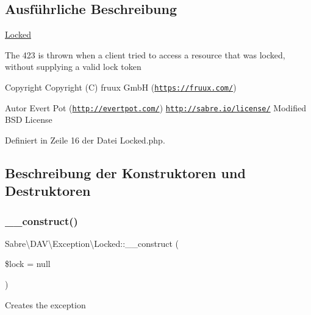 \subsection{Ausführliche Beschreibung}
\mbox{\hyperlink{class_sabre_1_1_d_a_v_1_1_exception_1_1_locked}{Locked}}

The 423 is thrown when a client tried to access a resource that was locked, without supplying a valid lock token

\begin{DoxyCopyright}{Copyright}
Copyright (C) fruux GmbH (\href{https://fruux.com/}{\tt https\+://fruux.\+com/}) 
\end{DoxyCopyright}
\begin{DoxyAuthor}{Autor}
Evert Pot (\href{http://evertpot.com/}{\tt http\+://evertpot.\+com/})  \href{http://sabre.io/license/}{\tt http\+://sabre.\+io/license/} Modified B\+SD License 
\end{DoxyAuthor}


Definiert in Zeile 16 der Datei Locked.\+php.



\subsection{Beschreibung der Konstruktoren und Destruktoren}
\mbox{\label{class_sabre_1_1_d_a_v_1_1_exception_1_1_locked_af7e916f724fb6dd17aef1059a4cb7ce1}} 
\subsubsection{\texorpdfstring{\+\_\+\+\_\+construct()}{\_\_construct()}}
{\footnotesize\ttfamily Sabre\textbackslash{}\+D\+A\+V\textbackslash{}\+Exception\textbackslash{}\+Locked\+::\+\_\+\+\_\+construct (\begin{DoxyParamCaption}\item[{\mbox{\hyperlink{class_sabre_1_1_d_a_v_1_1_locks_1_1_lock_info}{D\+A\+V\textbackslash{}\+Locks\textbackslash{}\+Lock\+Info}}}]{\$lock = {\ttfamily null} }\end{DoxyParamCaption})}

Creates the exception

